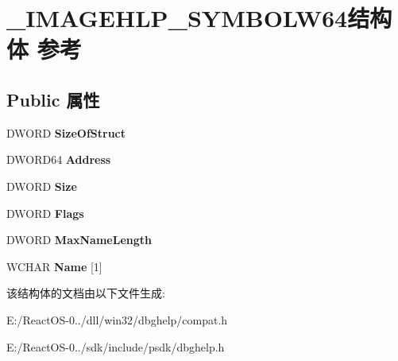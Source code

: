 \hypertarget{struct___i_m_a_g_e_h_l_p___s_y_m_b_o_l_w64}{}\section{\+\_\+\+I\+M\+A\+G\+E\+H\+L\+P\+\_\+\+S\+Y\+M\+B\+O\+L\+W64结构体 参考}
\label{struct___i_m_a_g_e_h_l_p___s_y_m_b_o_l_w64}
\subsection*{Public 属性}
\begin{DoxyCompactItemize}
\item 
\mbox{\label{struct___i_m_a_g_e_h_l_p___s_y_m_b_o_l_w64_ac12680d87ed5ebc9da3768dfbb99e40d}} 
D\+W\+O\+RD {\bfseries Size\+Of\+Struct}
\item 
\mbox{\label{struct___i_m_a_g_e_h_l_p___s_y_m_b_o_l_w64_ad3c5b814efa96aed12d12baedf04131c}} 
D\+W\+O\+R\+D64 {\bfseries Address}
\item 
\mbox{\label{struct___i_m_a_g_e_h_l_p___s_y_m_b_o_l_w64_a9c83ea40dc92abb3639387bb2b3efd65}} 
D\+W\+O\+RD {\bfseries Size}
\item 
\mbox{\label{struct___i_m_a_g_e_h_l_p___s_y_m_b_o_l_w64_ac5beaabca7d9e8ac47ece24832110a70}} 
D\+W\+O\+RD {\bfseries Flags}
\item 
\mbox{\label{struct___i_m_a_g_e_h_l_p___s_y_m_b_o_l_w64_a7b3d04cd724b2f36cc54880112c1511e}} 
D\+W\+O\+RD {\bfseries Max\+Name\+Length}
\item 
\mbox{\label{struct___i_m_a_g_e_h_l_p___s_y_m_b_o_l_w64_a1b00bccdde5a81e2f29a50eda4300172}} 
W\+C\+H\+AR {\bfseries Name} \mbox{[}1\mbox{]}
\end{DoxyCompactItemize}


该结构体的文档由以下文件生成\+:\begin{DoxyCompactItemize}
\item 
E\+:/\+React\+O\+S-\/0../dll/win32/dbghelp/compat.\+h\item 
E\+:/\+React\+O\+S-\/0../sdk/include/psdk/dbghelp.\+h\end{DoxyCompactItemize}
